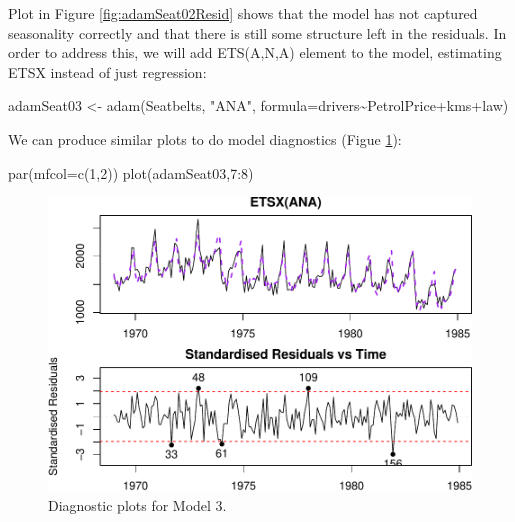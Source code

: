 \documentclass[
]{book}
\newenvironment{Shaded}{\begin{snugshade}}{\end{snugshade}}
\newcommand{\AttributeTok}[1]{\textcolor[rgb]{0.77,0.63,0.00}{#1}}
\newcommand{\DecValTok}[1]{\textcolor[rgb]{0.00,0.00,0.81}{#1}}
\newcommand{\FunctionTok}[1]{\textcolor[rgb]{0.00,0.00,0.00}{#1}}
\newcommand{\NormalTok}[1]{#1}
\newcommand{\OtherTok}[1]{\textcolor[rgb]{0.56,0.35,0.01}{#1}}
\newcommand{\SpecialCharTok}[1]{\textcolor[rgb]{0.00,0.00,0.00}{#1}}
\newcommand{\StringTok}[1]{\textcolor[rgb]{0.31,0.60,0.02}{#1}}
\theoremstyle{definition}
\theoremstyle{definition}
\theoremstyle{definition}
\theoremstyle{definition}
\theoremstyle{remark}
\begin{document}
Plot in Figure \ref{fig:adamSeat02Resid} shows that the model has not captured seasonality correctly and that there is still some structure left in the residuals. In order to address this, we will add ETS(A,N,A) element to the model, estimating ETSX instead of just regression:

\begin{Shaded}
\begin{Highlighting}[]
\NormalTok{adamSeat03 }\OtherTok{\textless{}{-}} \FunctionTok{adam}\NormalTok{(Seatbelts, }\StringTok{"ANA"}\NormalTok{,}
                   \AttributeTok{formula=}\NormalTok{drivers}\SpecialCharTok{\textasciitilde{}}\NormalTok{PetrolPrice}\SpecialCharTok{+}\NormalTok{kms}\SpecialCharTok{+}\NormalTok{law)}
\end{Highlighting}
\end{Shaded}

We can produce similar plots to do model diagnostics (Figue \ref{fig:adamSeat03}):

\begin{Shaded}
\begin{Highlighting}[]
\FunctionTok{par}\NormalTok{(}\AttributeTok{mfcol=}\FunctionTok{c}\NormalTok{(}\DecValTok{1}\NormalTok{,}\DecValTok{2}\NormalTok{))}
\FunctionTok{plot}\NormalTok{(adamSeat03,}\DecValTok{7}\SpecialCharTok{:}\DecValTok{8}\NormalTok{)}
\end{Highlighting}
\end{Shaded}

\begin{figure}
\centering
\includegraphics{Svetunkov--2022----ADAM_files/figure-latex/adamSeat03-1.pdf}
\caption{\label{fig:adamSeat03}Diagnostic plots for Model 3.}
\end{figure}
\end{document}
